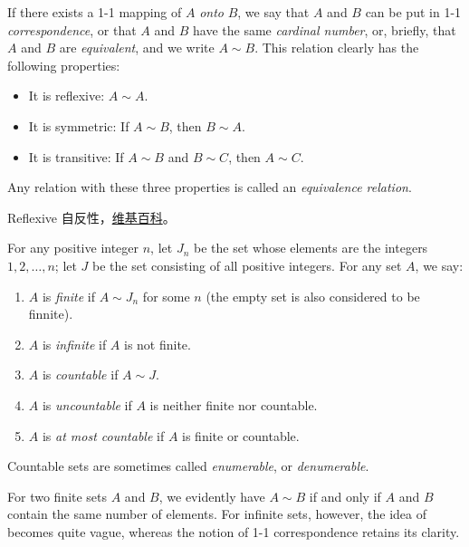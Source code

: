 \documentclass[../poma-notes.tex]{subfiles}
\begin{document}
\begin{definition}
  If there exists a 1-1 mapping of $A$ \textit{onto} $B$, we say that $A$ and $B$ can be put in 1-1 \textit{correspondence},
  or that $A$ and $B$ have the same \textit{cardinal number}, or, briefly, that $A$ and $B$ are \textit{equivalent},
  and we write $A \sim B$. This relation clearly has the following properties:
  \begin{itemize}
    \item[] It is reflexive: $A \sim A$.
    \item[] It is symmetric: If $A \sim B$, then $B \sim A$.
    \item[] It is transitive: If $A \sim B$ and $B \sim C$, then $A \sim C$.
  \end{itemize}
  Any relation with these three properties is called an \textit{equivalence relation}.
\end{definition}

\anote Reflexive 自反性，\href{https://en.wikipedia.org/wiki/Reflexive_relation}{维基百科}。

\begin{definition}
  For any positive integer $n$, let $J_n$ be the set whose elements are the integers $1,2,\dots,n$; let $J$ be
  the set consisting of all positive integers. For any set $A$, we say:
  \begin{enumerate}[label=(\alph*)]
    \item $A$ is \textit{finite} if $A \sim J_n$ for some $n$ (the empty set is also considered to be finnite).
    \item $A$ is \textit{infinite} if $A$ is not finite.
    \item $A$ is \textit{countable} if $A \sim J$.
    \item $A$ is \textit{uncountable} if $A$ is neither finite nor countable.
    \item $A$ is \textit{at most countable} if $A$ is finite or countable.
  \end{enumerate}

  Countable sets are sometimes called \textit{enumerable}, or \textit{denumerable}.

  For two finite sets $A$ and $B$, we evidently have $A \sim B$ if and only if $A$ and $B$ contain the same number of
  elements. For infinite sets, however, the idea of  becomes quite vague,
  whereas the notion of 1-1 correspondence retains its clarity.
\end{definition}
\end{document}
